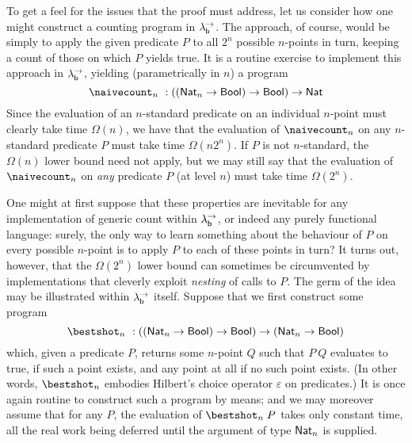 \documentclass[12pt,phd,lfcs,twoside,openright,logo,leftchapter,normalheadings]{infthesis}
\theoremstyle{plain}
\theoremstyle{definition}
\begin{document}

To get a feel for the issues that the proof must address, let us
consider how one might construct a counting program in $\lambda^\rightarrow_{\mathsf{b}}$.  The
\naive approach, of course, would be simply to apply the given
predicate $P$ to all $2^n$ possible $n$-points in turn, keeping a
count of those on which $P$ yields true.  It is a routine exercise to
implement this approach in $\lambda^\rightarrow_{\mathsf{b}}$, yielding (parametrically in $n$) a
program
%
{
\[
  \naivecount_n ~: ((\Nat_n \to \Bool) \to \Bool) \to \Nat
\]}%
%
Since the evaluation of an $n$-standard predicate on an individual
$n$-point must clearly take time $\Omega(n)$, we have that the
evaluation of $\naivecount_n$ on any $n$-standard predicate $P$ must
take time $\Omega(n2^n)$. If $P$ is not $n$-standard, the $\Omega(n)$
lower bound need not apply, but we may still say that the evaluation
of $\naivecount_n$ on \emph{any} predicate $P$ (at level $n$) must
take time $\Omega(2^n)$.

One might at first suppose that these properties are inevitable for
any implementation of generic count within $\lambda^\rightarrow_{\mathsf{b}}$, or indeed any
purely functional language: surely, the only way to learn something
about the behaviour of $P$ on every possible $n$-point is to apply $P$
to each of these points in turn?  It turns out, however, that the
$\Omega(2^n)$ lower bound can sometimes be circumvented by
implementations that cleverly exploit \emph{nesting} of calls to $P$.
%
The germ of the idea may be illustrated within $\lambda^\rightarrow_{\mathsf{b}}$ itself.
Suppose that we first construct some program
%
{
\[
  \bestshot_n ~: ((\Nat_n \to \Bool) \to \Bool) \to (\Nat_n \to \Bool)
\]}%
%
which, given a predicate $P$, returns some $n$-point $Q$ such that
$P~Q$ evaluates to true, if such a point exists, and any point at all
if no such point exists.
%
(In other words, $\bestshot_n$ embodies Hilbert's choice operator
$\varepsilon$ on predicates.)
%
It is once again routine to construct such a program by \naive means;
and we may moreover assume that for any $P$, the evaluation of
$\bestshot_n\;P$ takes only constant time, all the real work being
deferred until the argument of type $\mathsf{Nat}_n$ is supplied.
\end{document}
